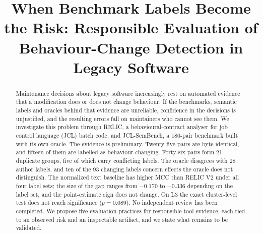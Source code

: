 \documentclass[conference]{IEEEtran}
\def\AnonFlag{1}
\begin{document}
\title{When Benchmark Labels Become the Risk: Responsible Evaluation of Behaviour-Change Detection in Legacy Software}

\ifdefined\AnonFlag
\author{
}
\else
\author{
\and
{}\and
{}\and
{}
}
\fi

\maketitle

\begin{abstract}
Maintenance decisions about legacy software increasingly rest on automated evidence that a modification does or does not change behaviour. If the benchmarks, semantic labels and oracles behind that evidence are unreliable, confidence in the decisions is unjustified, and the resulting errors fall on maintainers who cannot see them. We investigate this problem through RELIC, a behavioural-contract analyser for job control language (JCL) batch code, and JCL-SemBench, a 180-pair benchmark built with its own oracle. The evidence is preliminary. Twenty-five pairs are byte-identical, and fifteen of them are labelled as behaviour-changing. Forty-six pairs form 21 duplicate groups, five of which carry conflicting labels. The oracle disagrees with 28 author labels, and ten of the 93 changing labels concern effects the oracle does not distinguish. The normalized text baseline has higher MCC than RELIC V2 under all four label sets; the size of the gap ranges from $-0.170$ to $-0.336$ depending on the label set, and the point-estimate sign does not change. On L3 the exact cluster-level test does not reach significance ($p=0.089$). No independent review has been completed. We propose five evaluation practices for responsible tool evidence, each tied to an observed risk and an inspectable artifact, and we state what remains to be validated.
\end{abstract}
\end{document}
